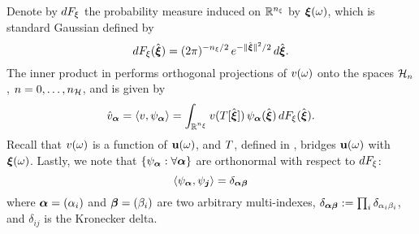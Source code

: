 Denote by $\d\distribution_\z$ the probability measure induced on $\real^\nvars$ by $\vz(\o)$, which is standard Gaussian defined by
\[
  \d\distribution_\z(\hat{\vz}) = (2 \pi)^{-\nvars/2} \, e^{-\norm{\hat{\vz}}^2 / 2} \, \d\hat{\vz}.
\]
The inner product in  performs orthogonal projections of $\w(\o)$ onto the spaces $\chaosSpace_n$, $n = 0, \dots, \ncorder$, and is given by
\begin{equation} \xelab{orthogonal-projection}
  \coefficient{\w}_{\multiindex} = \innerProduct{\w, \polynomial_{\multiindex}} = \int_{\real^{\nvars}} \w(\transformation[\hat{\vz}]) \, \polynomial_{\multiindex}(\hat{\vz}) \, \d\distribution_\z(\hat{\vz}).
\end{equation}
Recall that $\w(\o)$ is a function of $\vu(\o)$, and $\transformation$, defined in , bridges $\vu(\o)$ with $\vz(\o)$.
Lastly, we note that $\{ \polynomial_{\multiindex}: \forall \multiindex \}$ are orthonormal with respect to $\d\distribution_\z$:
\[
  \innerProduct{\polynomial_{\multiindex}, \polynomial_{\multiindex[j]}} = \delta_{\multiindex \multiindex[\beta]}
\]
where $\multiindex = (\alpha_i)$ and $\multiindex[\beta] = (\beta_i)$ are two arbitrary multi-indexes, $\delta_{\multiindex \multiindex[\beta]} := \prod_i \delta_{\alpha_i \beta_i}$, and $\delta_{ij}$ is the Kronecker delta.
